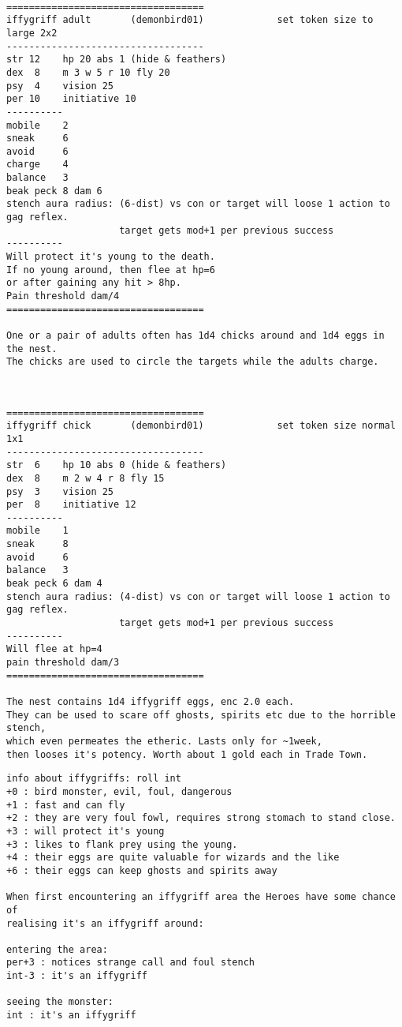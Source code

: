 \

\pagebreak[1]
\tiny \begin{samepage} \begin{verbatim}
===================================
iffygriff adult       (demonbird01)             set token size to large 2x2
-----------------------------------
str 12    hp 20 abs 1 (hide & feathers)
dex  8    m 3 w 5 r 10 fly 20
psy  4    vision 25
per 10    initiative 10
----------
mobile    2
sneak     6
avoid     6
charge    4
balance   3
beak peck 8 dam 6
stench aura radius: (6-dist) vs con or target will loose 1 action to gag reflex.
                    target gets mod+1 per previous success
----------
Will protect it's young to the death.
If no young around, then flee at hp=6
or after gaining any hit > 8hp.
Pain threshold dam/4
===================================

One or a pair of adults often has 1d4 chicks around and 1d4 eggs in the nest.
The chicks are used to circle the targets while the adults charge.
\end{verbatim} \end{samepage} \normalsize

\

\pagebreak[1]
\tiny \begin{samepage} \begin{verbatim}
===================================
iffygriff chick       (demonbird01)             set token size normal 1x1
-----------------------------------
str  6    hp 10 abs 0 (hide & feathers)
dex  8    m 2 w 4 r 8 fly 15
psy  3    vision 25
per  8    initiative 12
----------
mobile    1
sneak     8
avoid     6
balance   3
beak peck 6 dam 4
stench aura radius: (4-dist) vs con or target will loose 1 action to gag reflex.
                    target gets mod+1 per previous success
----------
Will flee at hp=4
pain threshold dam/3
===================================

The nest contains 1d4 iffygriff eggs, enc 2.0 each.
They can be used to scare off ghosts, spirits etc due to the horrible stench,
which even permeates the etheric. Lasts only for ~1week,
then looses it's potency. Worth about 1 gold each in Trade Town.

\end{verbatim} \pagebreak[1] \begin{verbatim}
info about iffygriffs: roll int
+0 : bird monster, evil, foul, dangerous
+1 : fast and can fly
+2 : they are very foul fowl, requires strong stomach to stand close.
+3 : will protect it's young
+3 : likes to flank prey using the young.
+4 : their eggs are quite valuable for wizards and the like
+6 : their eggs can keep ghosts and spirits away

When first encountering an iffygriff area the Heroes have some chance of
realising it's an iffygriff around:

entering the area:
per+3 : notices strange call and foul stench
int-3 : it's an iffygriff

seeing the monster:
int : it's an iffygriff
\end{verbatim} \end{samepage} \normalsize

